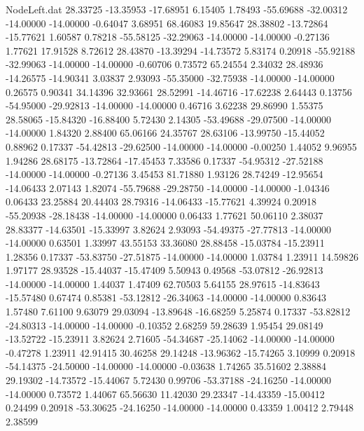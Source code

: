\begin{filecontents}{NodeLeft.dat}
  28.33725  -13.35953  -17.68951     6.15405    1.78493  -55.69688  -32.00312  -14.00000  -14.00000   -0.64047    3.68951   68.46083   19.85647
  28.38802  -13.72864  -15.77621     1.60587    0.78218  -55.58125  -32.29063  -14.00000  -14.00000   -0.27136    1.77621   17.91528    8.72612
  28.43870  -13.39294  -14.73572     5.83174    0.20918  -55.92188  -32.99063  -14.00000  -14.00000   -0.60706    0.73572   65.24554    2.34032
  28.48936  -14.26575  -14.90341     3.03837    2.93093  -55.35000  -32.75938  -14.00000  -14.00000    0.26575    0.90341   34.14396   32.93661
  28.52991  -14.46716  -17.62238     2.64443    0.13756  -54.95000  -29.92813  -14.00000  -14.00000    0.46716    3.62238   29.86990    1.55375
  28.58065  -15.84320  -16.88400     5.72430    2.14305  -53.49688  -29.07500  -14.00000  -14.00000    1.84320    2.88400   65.06166   24.35767
  28.63106  -13.99750  -15.44052     0.88962    0.17337  -54.42813  -29.62500  -14.00000  -14.00000   -0.00250    1.44052    9.96955    1.94286
  28.68175  -13.72864  -17.45453     7.33586    0.17337  -54.95312  -27.52188  -14.00000  -14.00000   -0.27136    3.45453   81.71880    1.93126
  28.74249  -12.95654  -14.06433     2.07143    1.82074  -55.79688  -29.28750  -14.00000  -14.00000   -1.04346    0.06433   23.25884   20.44403
  28.79316  -14.06433  -15.77621     4.39924    0.20918  -55.20938  -28.18438  -14.00000  -14.00000    0.06433    1.77621   50.06110    2.38037
  28.83377  -14.63501  -15.33997     3.82624    2.93093  -54.49375  -27.77813  -14.00000  -14.00000    0.63501    1.33997   43.55153   33.36080
  28.88458  -15.03784  -15.23911     1.28356    0.17337  -53.83750  -27.51875  -14.00000  -14.00000    1.03784    1.23911   14.59826    1.97177
  28.93528  -15.44037  -15.47409     5.50943    0.49568  -53.07812  -26.92813  -14.00000  -14.00000    1.44037    1.47409   62.70503    5.64155
  28.97615  -14.83643  -15.57480     0.67474    0.85381  -53.12812  -26.34063  -14.00000  -14.00000    0.83643    1.57480    7.61100    9.63079
  29.03094  -13.89648  -16.68259     5.25874    0.17337  -53.82812  -24.80313  -14.00000  -14.00000   -0.10352    2.68259   59.28639    1.95454
  29.08149  -13.52722  -15.23911     3.82624    2.71605  -54.34687  -25.14062  -14.00000  -14.00000   -0.47278    1.23911   42.91415   30.46258
  29.14248  -13.96362  -15.74265     3.10999    0.20918  -54.14375  -24.50000  -14.00000  -14.00000   -0.03638    1.74265   35.51602    2.38884
  29.19302  -14.73572  -15.44067     5.72430    0.99706  -53.37188  -24.16250  -14.00000  -14.00000    0.73572    1.44067   65.56630   11.42030
  29.23347  -14.43359  -15.00412     0.24499    0.20918  -53.30625  -24.16250  -14.00000  -14.00000    0.43359    1.00412    2.79448    2.38599

\end{filecontents}
